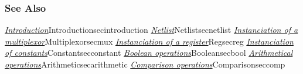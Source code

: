 \begin{htmlonly}

\subsubsection{See Also}

\hyperref[ref]{\emph{Introduction}}{}{Introduction}{secintroduction}
\hyperref[ref]{\emph{Netlist}}{}{Netlist}{secnetlist}
\hyperref[ref]{\emph{Instanciation of a multiplexor}}{}{Multiplexor}{secmux}
\hyperref[ref]{\emph{Instanciation of a register}}{}{Reg}{secreg}
\hyperref[ref]{\emph{Instanciation of constants}}{}{Constant}{secconstant}
\hyperref[ref]{\emph{Boolean operations}}{}{Boolean}{secbool}
\hyperref[ref]{\emph{Arithmetical operations}}{}{Arithmetic}{secarithmetic}
\hyperref[ref]{\emph{Comparison operations}}{}{Comparison}{seccomp}

\end{htmlonly}
